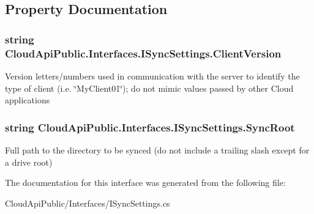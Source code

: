 \subsection{Property Documentation}
\hypertarget{interface_cloud_api_public_1_1_interfaces_1_1_i_sync_settings_a10e2af418073326f5ff218b13faee6c6}{
\subsubsection[{Client\-Version}]{\setlength{\rightskip}{0pt plus 5cm}string Cloud\-Api\-Public.\-Interfaces.\-I\-Sync\-Settings.\-Client\-Version\hspace{0.3cm}{\ttfamily [get]}}}\label{interface_cloud_api_public_1_1_interfaces_1_1_i_sync_settings_a10e2af418073326f5ff218b13faee6c6}


Version letters/numbers used in communication with the server to identify the type of client (i.\-e. \char`\"{}\-My\-Client01\char`\"{}); do not mimic values passed by other Cloud applications 

\hypertarget{interface_cloud_api_public_1_1_interfaces_1_1_i_sync_settings_a662415673548d8374f63b50d5e58b8ba}{
\subsubsection[{Sync\-Root}]{\setlength{\rightskip}{0pt plus 5cm}string Cloud\-Api\-Public.\-Interfaces.\-I\-Sync\-Settings.\-Sync\-Root\hspace{0.3cm}{\ttfamily [get]}}}\label{interface_cloud_api_public_1_1_interfaces_1_1_i_sync_settings_a662415673548d8374f63b50d5e58b8ba}


Full path to the directory to be synced (do not include a trailing slash except for a drive root) 



The documentation for this interface was generated from the following file\-:\begin{DoxyCompactItemize}
\item 
Cloud\-Api\-Public/\-Interfaces/I\-Sync\-Settings.\-cs\end{DoxyCompactItemize}
